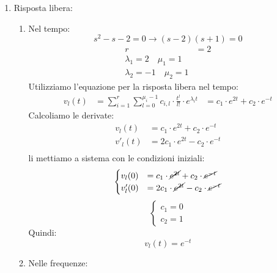 \documentclass[a4paper]{article}
\begin{document}
\begin{example}
\begin{enumerate}
    \item Risposta libera:
      \begin{enumerate}
        \item Nel tempo:
          \[
          s^2-s-2 = 0 \to (s-2)(s+1) = 0
          \] 
          \[
            \begin{aligned}
              r &= 2\\
              \lambda_1 = 2 \quad \mu_1 = 1\\
              \lambda_2 = -1 \quad \mu_2 = 1
            \end{aligned}
          \] 
          Utilizziamo l'equazione per la risposta libera nel tempo:
          \[
            \begin{aligned}
              v_l(t) &= \sum_{i=1}^{r} \sum_{l=0}^{\mu_i-1} c_{i,l} \cdot \frac{t^l}{l!} \cdot e^{\lambda_i t}
                     &= c_1 \cdot e^{2t} + c_2 \cdot e^{-t}
            \end{aligned}
          \] 
          Calcoliamo le derivate:
          \[
          \begin{aligned}
            v_l(t) &= c_1 \cdot e^{2t} + c_2 \cdot e^{-t}\\
            v'_l(t) &= 2c_1 \cdot e^{2t} - c_2 \cdot e^{-t}\\
          \end{aligned}
          \] 
          li mettiamo a sistema con le condizioni iniziali:
          \[
            \begin{cases}
              v_l(0) &= c_1 \cdot \cancel{e^{2t}} + c_2 \cdot \cancel{e^{-t}}\\
              v'_l(0) &= 2c_1 \cdot \cancel{e^{2t}} - c_2 \cdot \cancel{e^{-t}}\\
            \end{cases}
          \] 
          \[
            \begin{cases}
              c_1 = 0\\
              c_2 = 1
            \end{cases}
          \]
          Quindi:
          \[
            v_l(t) = e^{-t}
          \]

        \item Nelle frequenze:
          

\end{enumerate}
\end{enumerate}
\end{example}
\end{document}
